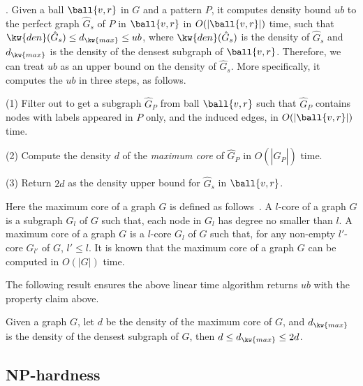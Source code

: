 .
Given a ball $\ball{v,r}$ in $G$ and a pattern $P$, it computes density bound $ub$ to the perfect graph $\hat{G}_s$ of $P$ in $\ball{v,r}$ in $O(|\ball{v,r}|)$ time, such that $\kw{den}(\hat{G}_s) \leq d_{\kw{max}} \leq ub$, where $\kw{den}(\hat{G}_s)$ is the density of $\hat{G}_s$ and $d_{\kw{max}}$ is the density of the densest subgraph of $\ball{v,r}$.
Therefore, we can treat $ub$ as an upper bound on the density of $\hat{G}_s$. More specifically, it computes the $ub$ in three steps, as follows.

\sstab (1) Filter out to get a subgraph $\hat{G}_P$ from ball $\ball{v,r}$ such that $\hat{G}_P$ contains nodes with labels appeared in $P$ only, and the induced edges, in $O(|\ball{v,r}|)$ time.

\sstab (2) Compute the density $d$ of the {\em maximum core} of $\hat{G}_P$ in $O(|\hat{G}_P|)$ time.

\sstab (3) Return $2d$ as the density upper bound for $\hat{G}_s$ in $\ball{v,r}$.

Here the maximum core of a graph $G$ is defined as follows~\cite{EVMK12}.
A $l$-core of a graph $G$ is a subgraph $G_l$ of $G$ such that, each node in $G_l$ has degree no smaller than $l$.
A maximum core of a graph $G$ is a $l$-core $G_l$ of $G$ such that, for any non-empty $l'$-core $G_{l'}$ of $G$, $l'\leq l$. It is known that the maximum core of a graph $G$ can be computed in $O(|G|)$ time.

The following result ensures the above linear time algorithm returns $ub$ with the property claim above.

\begin{prop}
\label{prop-approximation-bound}
Given a graph $G$, let $d$ be the density of the maximum core of $G$, and $d_{\kw{max}}$ is the density of the densest subgraph of $G$, then $d\leq d_{\kw{max}} \leq 2d$.
\end{prop}



\subsection{NP-hardness}

